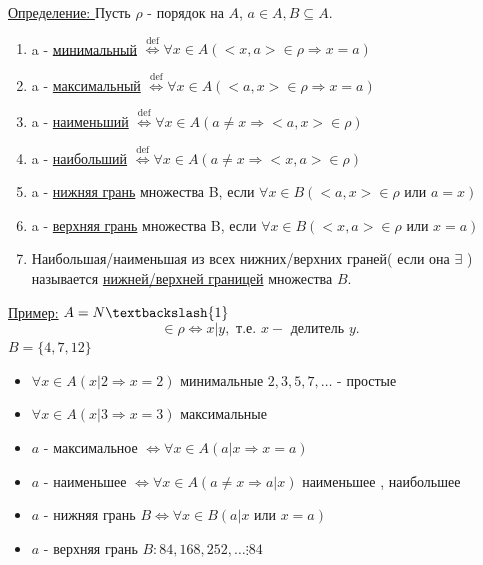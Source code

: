 \documentclass[12pt]{article}
\begin{document}
    \pagebreak
    \underline{Определение: } Пусть $\rho$ - порядок на $A$, $a \in A, B \subseteq  A$.
    \begin{enumerate}
        \item a - \underline{минимальный} $\overset{\text{def}}{\Leftrightarrow} \forall x \in A
        (<x,a> \in \rho \Rightarrow x=a)$
        \item a - \underline{максимальный} $\overset{\text{def}}{\Leftrightarrow} \forall x \in A
        (<a,x> \in \rho \Rightarrow x=a)$
        \item a - \underline{наименьший} $\overset{\text{def}}{\Leftrightarrow} \forall x \in A
        (a \not = x \Rightarrow <a,x> \in \rho)$
        \item a - \underline{наибольший} $\overset{\text{def}}{\Leftrightarrow} \forall x \in A
        (a \not = x \Rightarrow <x,a> \in \rho)$
        \item a - \underline{нижняя грань} множества B, если $\forall x \in B
        (<a,x> \in \rho \text{ или } a=x)$
        \item a - \underline{верхняя грань} множества B, если $\forall  x \in B 
        (<x,a> \in \rho \text{ или } x=a)$
        \item Наибольшая/наименьшая из всех нижних/верхних граней( если она $\exists$ ) \\
        называется
        \underline{нижней/верхней границей} множества $B$.
    \end{enumerate}
    \underline{Пример:} $A = N \textbackslash \{1\}$
    \[<x,y> \in \rho \Leftrightarrow x | y, \text{ т.е. } x - \text{ делитель }y.\]
    $B=\{4,7,12\}$
    \begin{itemize}
        \item $\forall x \in A ( x| 2 \Rightarrow x=2)$ минимальные $2,3,5,7,\dots$ - простые
        \item $\forall x \in A ( x| 3 \Rightarrow x=3)$ максимальные \textemdash 
        \item $a$ - максимальное $\Leftrightarrow \forall x \in A (a|x \Rightarrow x=a)$
        \item $a$ - наименьшее $\Leftrightarrow \forall x \in A (a \not = x \Rightarrow a|x)$ 
        наименьшее \textemdash , наибольшее \textemdash
        \item $a$ - нижняя грань $B \Leftrightarrow \forall x \in B (a|x \text{ или } x=a)$
        \item $a$ - верхняя грань $B: 84,168,252,\dots \vdots 84$
    \end{itemize}
\end{document}
